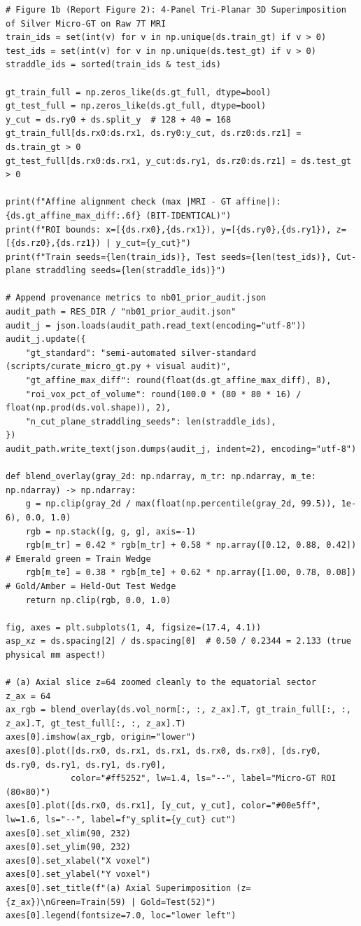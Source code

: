 \documentclass[10pt,a4paper]{article}
\renewcommand{\_}{\origunderscore\allowbreak}
\begin{document}
\begin{codebox}
\begin{lstlisting}[style=pybmed]
# Figure 1b (Report Figure 2): 4-Panel Tri-Planar 3D Superimposition of Silver Micro-GT on Raw 7T MRI
train_ids = set(int(v) for v in np.unique(ds.train_gt) if v > 0)
test_ids = set(int(v) for v in np.unique(ds.test_gt) if v > 0)
straddle_ids = sorted(train_ids & test_ids)

gt_train_full = np.zeros_like(ds.gt_full, dtype=bool)
gt_test_full = np.zeros_like(ds.gt_full, dtype=bool)
y_cut = ds.ry0 + ds.split_y  # 128 + 40 = 168
gt_train_full[ds.rx0:ds.rx1, ds.ry0:y_cut, ds.rz0:ds.rz1] = ds.train_gt > 0
gt_test_full[ds.rx0:ds.rx1, y_cut:ds.ry1, ds.rz0:ds.rz1] = ds.test_gt > 0

print(f"Affine alignment check (max |MRI - GT affine|): {ds.gt_affine_max_diff:.6f} (BIT-IDENTICAL)")
print(f"ROI bounds: x=[{ds.rx0},{ds.rx1}), y=[{ds.ry0},{ds.ry1}), z=[{ds.rz0},{ds.rz1}) | y_cut={y_cut}")
print(f"Train seeds={len(train_ids)}, Test seeds={len(test_ids)}, Cut-plane straddling seeds={len(straddle_ids)}")

# Append provenance metrics to nb01_prior_audit.json
audit_path = RES_DIR / "nb01_prior_audit.json"
audit_j = json.loads(audit_path.read_text(encoding="utf-8"))
audit_j.update({
    "gt_standard": "semi-automated silver-standard (scripts/curate_micro_gt.py + visual audit)",
    "gt_affine_max_diff": round(float(ds.gt_affine_max_diff), 8),
    "roi_vox_pct_of_volume": round(100.0 * (80 * 80 * 16) / float(np.prod(ds.vol.shape)), 2),
    "n_cut_plane_straddling_seeds": len(straddle_ids),
})
audit_path.write_text(json.dumps(audit_j, indent=2), encoding="utf-8")

def blend_overlay(gray_2d: np.ndarray, m_tr: np.ndarray, m_te: np.ndarray) -> np.ndarray:
    g = np.clip(gray_2d / max(float(np.percentile(gray_2d, 99.5)), 1e-6), 0.0, 1.0)
    rgb = np.stack([g, g, g], axis=-1)
    rgb[m_tr] = 0.42 * rgb[m_tr] + 0.58 * np.array([0.12, 0.88, 0.42])   # Emerald green = Train Wedge
    rgb[m_te] = 0.38 * rgb[m_te] + 0.62 * np.array([1.00, 0.78, 0.08])   # Gold/Amber = Held-Out Test Wedge
    return np.clip(rgb, 0.0, 1.0)

fig, axes = plt.subplots(1, 4, figsize=(17.4, 4.1))
asp_xz = ds.spacing[2] / ds.spacing[0]  # 0.50 / 0.2344 = 2.133 (true physical mm aspect!)

# (a) Axial slice z=64 zoomed cleanly to the equatorial sector
z_ax = 64
ax_rgb = blend_overlay(ds.vol_norm[:, :, z_ax].T, gt_train_full[:, :, z_ax].T, gt_test_full[:, :, z_ax].T)
axes[0].imshow(ax_rgb, origin="lower")
axes[0].plot([ds.rx0, ds.rx1, ds.rx1, ds.rx0, ds.rx0], [ds.ry0, ds.ry0, ds.ry1, ds.ry1, ds.ry0],
             color="#ff5252", lw=1.4, ls="--", label="Micro-GT ROI (80×80)")
axes[0].plot([ds.rx0, ds.rx1], [y_cut, y_cut], color="#00e5ff", lw=1.6, ls="--", label=f"y_split={y_cut} cut")
axes[0].set_xlim(90, 232)
axes[0].set_ylim(90, 232)
axes[0].set_xlabel("X voxel")
axes[0].set_ylabel("Y voxel")
axes[0].set_title(f"(a) Axial Superimposition (z={z_ax})\nGreen=Train(59) | Gold=Test(52)")
axes[0].legend(fontsize=7.0, loc="lower left")


\end{lstlisting}
\end{codebox}
\end{document}
